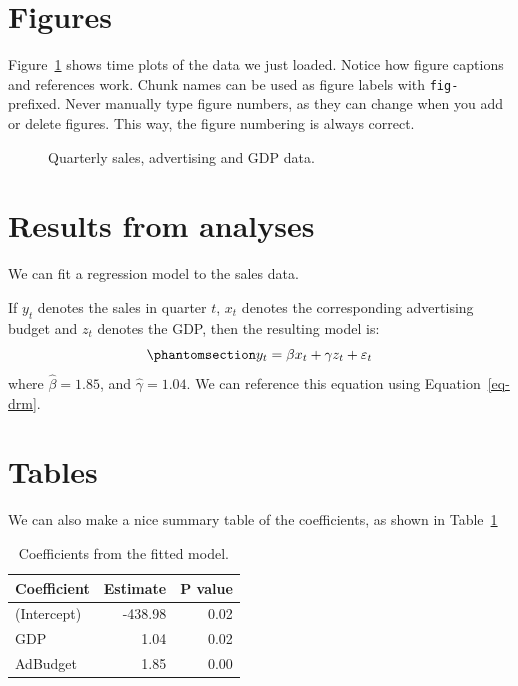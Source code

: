 \documentclass[
  11pt,
  a4paper,
  nottoc]{report}
\begin{document}
\section{Figures}\label{figures}

Figure~\ref{fig-deaths} shows time plots of the data we just loaded.
Notice how figure captions and references work. Chunk names can be used
as figure labels with \texttt{fig-} prefixed. Never manually type figure
numbers, as they can change when you add or delete figures. This way,
the figure numbering is always correct.

\begin{figure}


\caption{\label{fig-deaths}Quarterly sales, advertising and GDP data.}

\end{figure}%

\section{Results from analyses}\label{results-from-analyses}

We can fit a regression model to the sales data.

If \(y_t\) denotes the sales in quarter \(t\), \(x_t\) denotes the
corresponding advertising budget and \(z_t\) denotes the GDP, then the
resulting model is: \begin{equation}\phantomsection\label{eq-drm}{
  y_t = \beta x_t + \gamma z_t + \varepsilon_t
}\end{equation} where \(\hat{\beta} = 1.85\), and
\(\hat{\gamma} = 1.04\). We can reference this equation using
Equation~\ref{eq-drm}.

\section{Tables}\label{tables}

We can also make a nice summary table of the coefficients, as shown in
Table~\ref{tbl-coef}

\begin{longtable}[]{@{}lrr@{}}

\caption{\label{tbl-coef}Coefficients from the fitted model.}

\tabularnewline

\toprule\noalign{}
Coefficient & Estimate & P value \\
\midrule\noalign{}
\endhead
\bottomrule\noalign{}
\endlastfoot
(Intercept) & -438.98 & 0.02 \\
GDP & 1.04 & 0.02 \\
AdBudget & 1.85 & 0.00 \\

\end{longtable}
\end{document}
